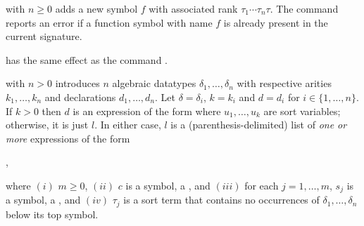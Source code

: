 \begin{description}
\smallskip

%
\item[\expr{(declare-fun $f$ ($\tau_1$ $\cdots$ $\tau_n$) $\tau$)}]
with $n \geq 0$ adds a new symbol $f$ 
with associated rank $\tau_1\cdots\tau_n\tau$.
The command reports an error if a function symbol with name $f$ 
is already present in the current signature.
\smallskip

%
\item[\expr{(declare-const $f$ $\tau$)}]
has the same effect as the command .
\smallskip


%
\item[%
\expr{(declare-datatypes (($\delta_1$ $k_1$) $\cdots$ ($\delta_n$ $k_n$))
                         ($d_1$ $\cdots$ $d_n$))}]
with $n > 0$ introduces $n$ algebraic datatypes $\delta_1,\dots,\delta_n$
with respective arities $k_1,\dots,k_n$ and declarations $d_1,\dots,d_n$. 
Let $\delta = \delta_i$, $k = k_i$ and $d = d_i$ for $i \in \{1,\ldots,n\}$.
If $k >0$ then $d$ is an expression of the form 
where $u_1, \ldots, u_k$ are sort variables;
otherwise, it is just $l$. 
In either case, $l$ is a (parenthesis-delimited) list of \emph{one or more} 
expressions of the form
%
\begin{center}
 ,
\end{center}
where 
$(i)$ $m \geq 0$, 
$(ii)$ $c$ is a symbol, a , and 
$(iii)$ for each $j=1,\ldots,m$, $s_j$ is a symbol, a , and 
$(iv)$ $\tau_j$ is a sort term
that contains no occurrences of $\delta_1, \ldots, \delta_n$ below its top symbol.


\end{description}
